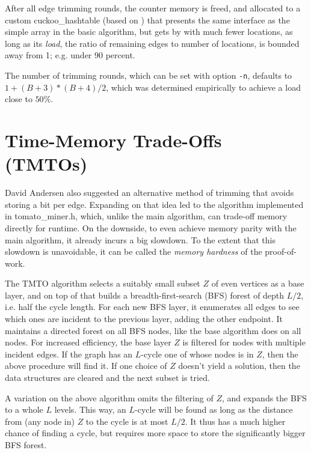 \documentclass[11pt, oneside]{article}
\begin{document}
After all edge trimming rounds, the counter memory is freed, and allocated to a
custom cuckoo\_hashtable (based on \cite{preshing2013}) that presents the same interface as the
simple array in the basic algorithm, but gets by with much fewer locations, as long as its {\em load},
the ratio of remaining edges to number of locations, is bounded away from 1; e.g. under 90 percent.

The number of trimming rounds, which can be set with option {\tt -n}, defaults to
$1+(B+3)*(B+4)/2$, which was determined empirically to achieve a load close to $50\%$.

\section{Time-Memory Trade-Offs (TMTOs)}
David Andersen also suggested an alternative method of trimming that avoids storing a bit per edge.
Expanding on that idea led to the algorithm implemented in tomato\_miner.h,
which, unlike the main algorithm, can trade-off memory directly for runtime.
On the downside, to even achieve memory parity with the main algorithm, it already incurs a big slowdown.
To the extent that this slowdown is unavoidable, it can be called the {\em memory hardness} of the proof-of-work.

The TMTO algorithm selects a suitably small subset $Z$ of even vertices as a base layer,
and on top of that builds a breadth-first-search
(BFS) forest of depth $L/2$, i.e. half the cycle length.
For each new BFS layer, it enumerates all edges to see which ones are incident
to the previous layer, adding the other endpoint.
It maintains a directed forest on all BFS nodes, like the base algorithm does on all nodes.
For increased efficiency, the base layer $Z$ is filtered for nodes with multiple incident edges.
If the graph has an $L$-cycle one of whose nodes is in $Z$, then the above procedure will find it.
If one choice of $Z$ doesn't yield a solution, then the data structures are cleared and the next
subset is tried.

A variation on the above algorithm omits the filtering of $Z$, and expands
the BFS to a whole $L$ levels. This way, an $L$-cycle will be found as long as the distance from (any node in)
$Z$ to the cycle is at most $L/2$. It thus has a much higher chance of finding a cycle, but requires
more space to store the significantly bigger BFS forest.
\end{document}
